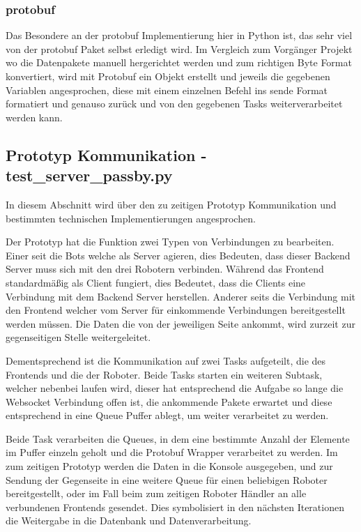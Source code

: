 \subsubsection{protobuf}
Das Besondere an der protobuf Implementierung hier in Python ist,
das sehr viel von der protobuf Paket selbst erledigt wird.
Im Vergleich zum Vorgänger Projekt wo die Datenpakete manuell hergerichtet werden
und zum richtigen Byte Format konvertiert, wird mit Protobuf ein Objekt erstellt 
und jeweils die gegebenen Variablen angesprochen, 
diese mit einem einzelnen Befehl ins sende Format formatiert und genauso zurück
und von den gegebenen Tasks weiterverarbeitet werden kann.


\subsection{Prototyp Kommunikation - test\_server\_passby.py}
In diesem Abschnitt wird über den zu zeitigen Prototyp Kommunikation 
und bestimmten technischen Implementierungen angesprochen.

Der Prototyp hat die Funktion zwei Typen von Verbindungen zu bearbeiten.
% 
Einer seit die Bots welche als Server agieren, 
dies Bedeuten, dass dieser Backend Server muss sich mit den drei Robotern verbinden.
Während das Frontend standardmäßig als Client fungiert, 
dies Bedeutet, dass die Clients eine Verbindung mit dem Backend Server herstellen.
% 
Anderer seits die Verbindung mit den Frontend 
welcher vom Server für einkommende Verbindungen bereitgestellt werden müssen.
% 
Die Daten die von der jeweiligen Seite ankommt, 
wird zurzeit zur gegenseitigen Stelle weitergeleitet.

Dementsprechend ist die Kommunikation auf zwei Tasks aufgeteilt,
die des Frontends und die der Roboter.
Beide Tasks starten ein weiteren Subtask, welcher nebenbei laufen wird, 
dieser hat entsprechend die Aufgabe so lange die Websocket Verbindung offen ist,
die ankommende Pakete erwartet und diese entsprechend in eine Queue Puffer ablegt, 
um weiter verarbeitet zu werden. 

Beide Task verarbeiten die Queues, 
in dem eine bestimmte Anzahl der Elemente im Puffer 
einzeln geholt und die Protobuf Wrapper verarbeitet zu werden.
% 
Im zum zeitigen Prototyp werden die Daten in die Konsole ausgegeben,
und zur Sendung der Gegenseite in eine weitere Queue 
für einen beliebigen Roboter bereitgestellt, 
oder im Fall beim zum zeitigen Roboter Händler an alle verbundenen Frontends gesendet.
% 
Dies symbolisiert in den nächsten Iterationen die Weitergabe 
in die Datenbank und Datenverarbeitung.

